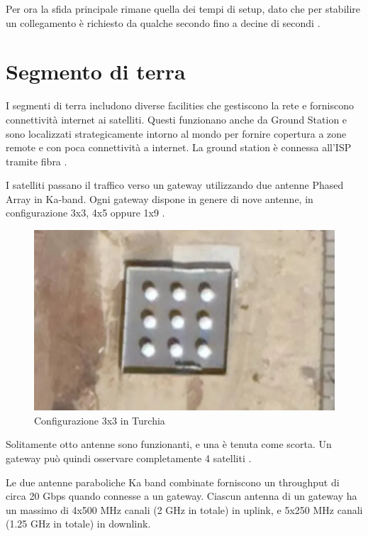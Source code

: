 Per ora la sfida principale rimane quella dei tempi di setup, dato che per stabilire un collegamento è richiesto da qualche secondo fino a decine di secondi \cite{chaudhry_laser_2021}.

\section{Segmento di terra}
I segmenti di terra includono diverse facilities che gestiscono la rete e forniscono connettività internet ai satelliti. Questi funzionano anche da Ground Station e sono localizzati strategicamente intorno al mondo per fornire copertura a zone remote e con poca connettività a internet.
La ground station è connessa all'\ac{ISP} tramite fibra \cite{branch_education_how_2022}.

I satelliti passano il traffico verso un gateway utilizzando due antenne Phased Array in \ac{Ka}-band. Ogni gateway dispone in genere di nove antenne, in configurazione 3x3, 4x5 oppure 1x9 \cite{mike_puchol_modeling_2022}.

\begin{figure}[htbp]
  \centering
  \includegraphics[width=0.9\linewidth]{./res/img/starlink_gateway.png}
  \caption{Configurazione 3x3 in Turchia \cite{mike_puchol_modeling_2022}}
  \label{fig:starlink-gateway}
\end{figure}

Solitamente otto antenne sono funzionanti, e una è tenuta come scorta.
Un gateway può quindi osservare completamente 4 satelliti \cite{mike_puchol_modeling_2022}.

Le due antenne paraboliche \ac{Ka} band combinate forniscono un throughput di circa 20 Gbps quando connesse a un gateway.
Ciascun antenna di un gateway ha un massimo di 4x500 MHz canali (2 GHz in totale) in uplink, e 5x250 MHz canali (1.25 GHz in totale) in downlink.

